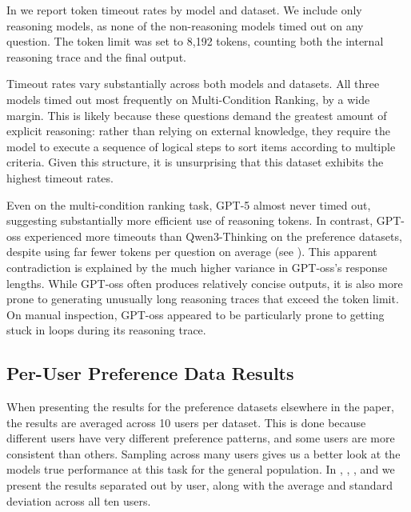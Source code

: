 In  we report token timeout rates by model and dataset. We include only reasoning models, as none of the non-reasoning models timed out on any question. The token limit was set to 8,192 tokens, counting both the internal reasoning trace and the final output.

Timeout rates vary substantially across both models and datasets. All three models timed out most frequently on Multi-Condition Ranking, by a wide margin. This is likely because these questions demand the greatest amount of explicit reasoning: rather than relying on external knowledge, they require the model to execute a sequence of logical steps to sort items according to multiple criteria. Given this structure, it is unsurprising that this dataset exhibits the highest timeout rates.

Even on the multi-condition ranking task, GPT-5 almost never timed out, suggesting substantially more efficient use of reasoning tokens. In contrast, GPT-oss experienced more timeouts than Qwen3-Thinking on the preference datasets, despite using far fewer tokens per question on average (see ). This apparent contradiction is explained by the much higher variance in GPT-oss’s response lengths. While GPT-oss often produces relatively concise outputs, it is also more prone to generating unusually long reasoning traces that exceed the token limit. On manual inspection, GPT-oss appeared to be particularly prone to getting stuck in loops during its reasoning trace.



\subsection{Per-User Preference Data Results}

When presenting the results for the preference datasets elsewhere in the paper, the results are averaged across 10 users per dataset. This is done because different users have very different preference patterns, and some users are more consistent than others. Sampling across many users gives us a better look at the models true performance at this task for the general population.
In , , , and  we present the results separated out by user, along with the average and standard deviation across all ten users.

